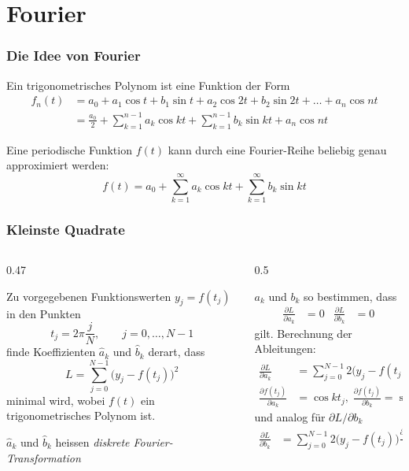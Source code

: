 \section{Fourier}

%
%
\begin{frame}
\frametitle{Die Idee von Fourier}
\begin{trigopol}
Ein trigonometrisches Polynom ist eine Funktion der Form
\begin{align*}
f_n(t)
&=
a_0 + a_1\cos t+b_1\sin t + a_2\cos 2t + b_2\sin 2t + \dots + a_n\cos nt
\\
&=
\frac{a_0}2 + \sum_{k=1}^{n-1} a_k \cos kt + \sum_{k=1}^{n-1}b_k\sin kt
+ a_n\cos nt
\end{align*}
\end{trigopol}
\begin{fourier}
Eine periodische Funktion $f(t)$ kann durch eine Fourier-Reihe beliebig
genau approximiert werden:
\[
f(t)
=
a_0 + \sum_{k=1}^{\infty}  a_k \cos kt + \sum_{k=1}^{\infty}b_k\sin kt
\]
\end{fourier}
\end{frame}

%
%
\begin{frame}
\frametitle{Kleinste Quadrate}
\begin{columns}
\begin{column}{0.47\hsize}
\begin{leastsquares}
Zu vorgegebenen Funktionswerten $y_j=f(t_j)$ in den Punkten
\[
t_j = 2\pi \frac{j}{N},\qquad j=0,\dots,N-1
\]
finde Koeffizienten $\hat a_k$ und $\hat b_k$ derart, dass
\[
L=\sum_{j=0}^{N-1} \bigl(y_j - f(t_j)\bigr)^2
\]
minimal wird, wobei $f(t)$ ein trigonometrisches Polynom ist.
\end{leastsquares}
$\hat{a}_k$ und $\hat{b}_k$ heissen {\em diskrete Fourier-Transformation}
\end{column}
\begin{column}{0.5\hsize}
\begin{loesung}
$a_k$ und $b_k$ so bestimmen, dass
\begin{align*}
\frac{\partial L}{\partial a_k}&=0&
\frac{\partial L}{\partial b_k}&=0
\end{align*}
gilt.
Berechnung der Ableitungen:
\begin{align*}
\frac{\partial L}{\partial a_k}
&=
\sum_{j=0}^{N-1}2\bigl(y_j-f(t_j)\bigr)
\frac{\partial f(t_j)}{\partial a_k}
\\
\frac{\partial f(t_j)}{\partial a_k}
&=
\cos kt_j
,\;
\frac{\partial f(t_j)}{\partial b_k}
=
\sin kt_j
\end{align*}
und analog für $\partial L/\partial b_k$
\begin{align*}
\frac{\partial L}{\partial b_k}
&=
\sum_{j=0}^{N-1}2\bigl(y_j-f(t_j)\bigr)
\frac{\partial f(t_j)}{\partial b_k}
\end{align*}
\end{loesung}
\end{column}
\end{columns}
\end{frame}

